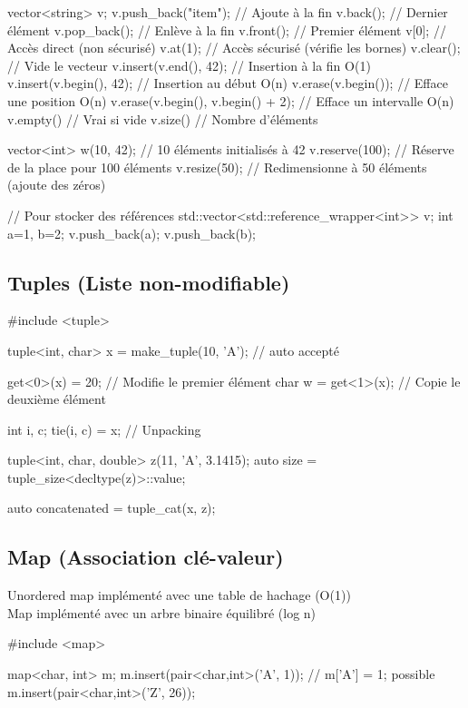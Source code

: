 \documentclass{article}
\begin{document}
\begin{multicols*}{4}
\begin{cppcode}
vector<string> v;
v.push_back("item"); // Ajoute à la fin
v.back();        // Dernier élément
v.pop_back();    // Enlève à la fin
v.front();       // Premier élément
v[0];            // Accès direct (non sécurisé)
v.at(1);         // Accès sécurisé (vérifie les bornes)
v.clear();       // Vide le vecteur
v.insert(v.end(), 42); // Insertion à la fin O(1)
v.insert(v.begin(), 42); // Insertion au début O(n)
v.erase(v.begin()); // Efface une position O(n)
v.erase(v.begin(), v.begin() + 2); // Efface un intervalle O(n)
v.empty() // Vrai si vide
v.size()  // Nombre d'éléments

vector<int> w(10, 42); // 10 éléments initialisés à 42
v.reserve(100); // Réserve de la place pour 100 éléments
v.resize(50);  // Redimensionne à 50 éléments (ajoute des zéros)

// Pour stocker des références
std::vector<std::reference_wrapper<int>> v;
int a=1, b=2; v.push_back(a); v.push_back(b);
\end{cppcode}

\subsection*{Tuples (Liste non-modifiable)}

\begin{cppcode}
#include <tuple>

tuple<int, char> x = make_tuple(10, 'A'); // auto accepté

get<0>(x) = 20; // Modifie le premier élément
char w = get<1>(x); // Copie le deuxième élément

int i, c;
tie(i, c) = x; // Unpacking

tuple<int, char, double> z(11, 'A', 3.1415);
auto size = tuple_size<decltype(z)>::value;

auto concatenated = tuple_cat(x, z);
\end{cppcode}

\subsection*{Map (Association clé-valeur)}
Unordered map implémenté avec une table de hachage (O(1))\\
Map implémenté avec un arbre binaire équilibré (log n)
\begin{cppcode}
#include <map>

map<char, int> m;
m.insert(pair<char,int>('A', 1)); // m['A'] = 1; possible
m.insert(pair<char,int>('Z', 26));


\end{cppcode}
\end{multicols*}
\end{document}
